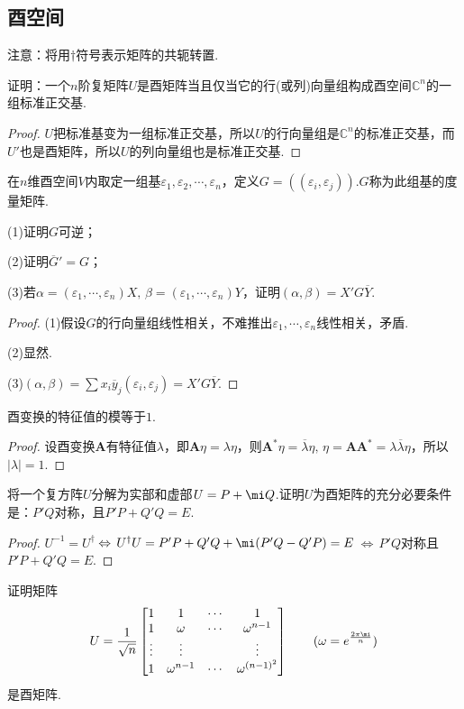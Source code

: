 \subsection{酉空间}
{\color{blue}注意}：将用$\dagger$符号表示矩阵的共轭转置.
\begin{prob}[2]
	证明：一个$n$阶复矩阵$U$是酉矩阵当且仅当它的行(或列)向量组构成酉空间$\mathbb{C}^n$的一组标准正交基.
\end{prob}
\begin{proof}
	$U$把标准基变为一组标准正交基，所以$U$的行向量组是$\mathbb{C}^n$的标准正交基，而$U'$也是酉矩阵，所以$U$的列向量组也是标准正交基.
\end{proof}
\begin{prob}[3]
	在$n$维酉空间$V$内取定一组基$\varepsilon_1,\varepsilon_2,\cdots,\varepsilon_n$，定义$G=((\varepsilon_i,\varepsilon_j))$.$G$称为此组基的度量矩阵.

	(1)证明$G$可逆；

	(2)证明$\overline{G}'=G$；

	(3)若$\alpha=(\varepsilon_1,\cdots,\varepsilon_n)X,\,\beta=(\varepsilon_1,\cdots,\varepsilon_n)Y$，证明$(\alpha,\beta)=X'G\overline{Y}$.
\end{prob}
\begin{proof}
	(1)假设$G$的行向量组线性相关，不难推出$\varepsilon_1,\cdots,\varepsilon_n$线性相关，矛盾.

	(2)显然.

	(3)$(\alpha,\beta)=\sum x_i\overline{y}_j(\varepsilon_i,\varepsilon_j)=X'G\overline{Y}$.
\end{proof}
\begin{prob}[5]
	酉变换的特征值的模等于$1$.
\end{prob}
\begin{proof}
	设酉变换$\bm A$有特征值$\lambda$，即$\bm A\eta=\lambda\eta$，则$\bm A^*\eta=\overline{\lambda}\eta,\,\eta=\bm A\bm A^*=\lambda\overline{\lambda}\eta$，所以$|\lambda|=1$.
\end{proof}
\begin{prob}[10]
	将一个复方阵$U$分解为实部和虚部$U=P+\mi Q$.证明$U$为酉矩阵的充分必要条件是：$P'Q$对称，且$P'P+Q'Q=E$.
\end{prob}
\begin{proof}
	$U^{-1}=U^\dagger$$\,\Leftrightarrow\,U^\dagger U=P'P+Q'Q+\mi(P'Q-Q'P)=E$$\,\Leftrightarrow\,$$P'Q$对称且$P'P+Q'Q=E$.
\end{proof}
\begin{prob}[11]
	证明矩阵
	\[
		U=\frac{1}{\sqrt{n}}\begin{bmatrix}
			1      & 1            & \cdots & 1                \\
			1      & \omega       & \cdots & \omega^{n-1}     \\
			\vdots & \vdots       &        & \vdots           \\
			1      & \omega^{n-1} & \cdots & \omega^{(n-1)^2}
		\end{bmatrix}\qquad(\omega=e^{\frac{2\pi\mi}{n}})
	\]
	是酉矩阵.
\end{prob}
